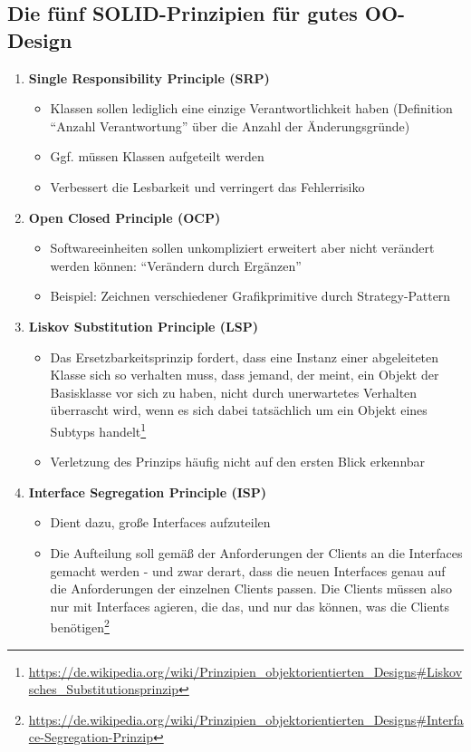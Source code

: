 \subsection{Die fünf SOLID-Prinzipien für gutes OO-Design}
\begin{enumerate}
	\item \textbf{Single Responsibility Principle (SRP)}
	\begin{itemize}
		\item Klassen sollen lediglich eine einzige Verantwortlichkeit haben (Definition "`Anzahl Verantwortung"' über die Anzahl der Änderungsgründe)
		\item Ggf. müssen Klassen aufgeteilt werden
		\item Verbessert die Lesbarkeit und verringert das Fehlerrisiko
	\end{itemize}
	\item \textbf{Open Closed Principle (OCP)}
	\begin{itemize}
		\item Softwareeinheiten sollen unkompliziert erweitert aber nicht verändert werden können: "`Verändern durch Ergänzen"'
		\item Beispiel: Zeichnen verschiedener Grafikprimitive durch Strategy-Pattern
	\end{itemize}
	\item \textbf{Liskov Substitution Principle (LSP)}
	\begin{itemize}
		\item Das Ersetzbarkeitsprinzip fordert, dass eine Instanz einer abgeleiteten Klasse sich so verhalten muss, dass jemand, der meint, ein Objekt der Basisklasse vor sich zu haben, nicht durch unerwartetes Verhalten überrascht wird, wenn es sich dabei tatsächlich um ein Objekt eines Subtyps handelt\footnote{\url{https://de.wikipedia.org/wiki/Prinzipien_objektorientierten_Designs\#Liskovsches_Substitutionsprinzip}}
		\item Verletzung des Prinzips häufig nicht auf den ersten Blick erkennbar
	\end{itemize}
	\item \textbf{Interface Segregation Principle (ISP)}
	\begin{itemize}
		\item Dient dazu, große Interfaces aufzuteilen
		\item Die Aufteilung soll gemäß der Anforderungen der Clients an die Interfaces gemacht werden - und zwar derart, dass die neuen Interfaces genau auf die Anforderungen der einzelnen Clients passen. Die Clients müssen also nur mit Interfaces agieren, die das, und nur das können, was die Clients benötigen\footnote{\url{https://de.wikipedia.org/wiki/Prinzipien_objektorientierten_Designs\#Interface-Segregation-Prinzip}}

\end{itemize}
\end{enumerate}
